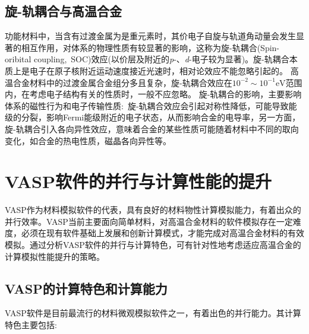 \subsection{旋-轨耦合与高温合金}
功能材料中，当含有过渡金属为是重元素时，其价电子自旋与轨道角动量会发生显著的相互作用，对体系的物理性质有较显著的影响，这称为旋-轨耦合\textrm{(Spin-oribital coupling,~SOC)}效应(以价层及附近的\textit{p}-、\textit{d}-电子较为显著)。旋-轨耦合本质上是电子在原子核附近运动速度接近光速时，相对论效应不能忽略引起的。%
高温合金材料中的过渡金属合金组分多且复杂，旋-轨耦合效应在$10^{-2}\sim10^{-1}\mathrm{eV}$范围内，在考虑电子结构有关的性质时，一般不应忽略。%
旋-轨耦合的影响，主要影响体系的磁性行为和电子传输性质:~旋-轨耦合效应会引起对称性降低，可能导致能级的分裂，影响\textrm{Fermi}能级附近的电子状态，从而影响合金的电导率，另一方面，旋-轨耦合引入各向异性效应，意味着合金的某些性质可能随着材料中不同的取向变化，如合金的热电性质，磁晶各向异性等。

\section{\rm{VASP}软件的并行与计算性能的提升}
\textrm{VASP}作为材料模拟软件的代表，具有良好的材料物性计算模拟能力，有着出众的并行效率。\textrm{VASP}当前主要面向简单材料，对高温合金材料的软件模拟存在一定难度，必须在现有软件基础上发展和创新计算模式，才能完成对高温合金材料的有效模拟。通过分析\textrm{VASP}软件的并行与计算特色，可有针对性地考虑适应高温合金的计算模拟性能提升的策略。

\subsection{\rm{VASP}的计算特色和计算能力}
\textrm{VASP}软件是目前最流行的材料微观模拟软件之一，有着出色的并行能力。其计算特色主要包括:

